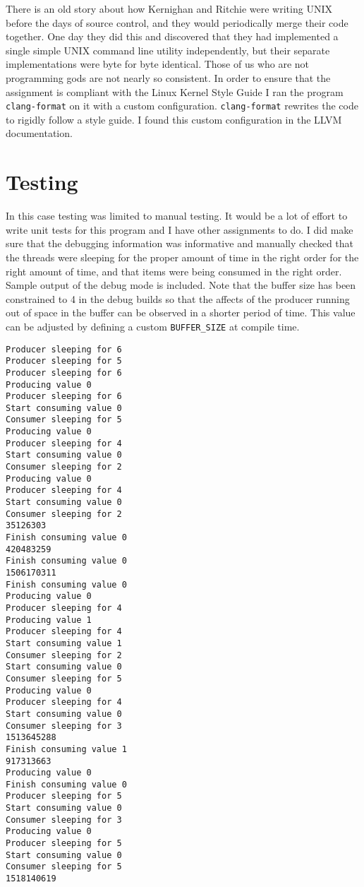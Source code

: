 \documentclass[10pt,conference,draftclsnofoot,onecolumn]{IEEEtran}
\begin{document}
There is an old story about how Kernighan and Ritchie were writing UNIX before the days of source control, and they would periodically merge their code together. One day they did this and discovered that they had implemented a single simple UNIX command line utility independently, but their separate implementations were byte for byte identical. Those of us who are not programming gods are not nearly so consistent. In order to ensure that the assignment is compliant with the Linux Kernel Style Guide I ran the program \texttt{clang-format} on it with a custom configuration. \texttt{clang-format} rewrites the code to rigidly follow a style guide. I found this custom configuration in the LLVM documentation.

\section{Testing}
In this case testing was limited to manual testing. It would be a lot of effort to write unit tests for this program and I have other assignments to do. I did make sure that the debugging information was informative and manually checked that the threads were sleeping for the proper amount of time in the right order for the right amount of time, and that items were being consumed in the right order. Sample output of the debug mode is included. Note that the buffer size has been constrained to 4 in the debug builds so that the affects of the producer running out of space in the buffer can be observed in a shorter period of time. This value can be adjusted by defining a custom \texttt{BUFFER\_SIZE} at compile time.

\begin{verbatim}
Producer sleeping for 6
Producer sleeping for 5
Producer sleeping for 6
Producing value 0
Producer sleeping for 6
Start consuming value 0
Consumer sleeping for 5
Producing value 0
Producer sleeping for 4
Start consuming value 0
Consumer sleeping for 2
Producing value 0
Producer sleeping for 4
Start consuming value 0
Consumer sleeping for 2
35126303
Finish consuming value 0
420483259
Finish consuming value 0
1506170311
Finish consuming value 0
Producing value 0
Producer sleeping for 4
Producing value 1
Producer sleeping for 4
Start consuming value 1
Consumer sleeping for 2
Start consuming value 0
Consumer sleeping for 5
Producing value 0
Producer sleeping for 4
Start consuming value 0
Consumer sleeping for 3
1513645288
Finish consuming value 1
917313663
Producing value 0
Finish consuming value 0
Producer sleeping for 5
Start consuming value 0
Consumer sleeping for 3
Producing value 0
Producer sleeping for 5
Start consuming value 0
Consumer sleeping for 5
1518140619
\end{verbatim}
\clearpage
\printbibliography
\end{document}
